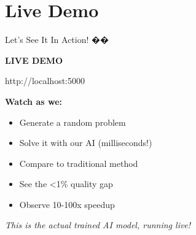 \documentclass[aspectratio=169]{beamer}
\begin{document}

\section{Live Demo}

\begin{frame}{Let's See It In Action! ��}
\begin{center}
\LARGE \textbf{LIVE DEMO}

\vspace{1cm}

\large \textcolor{aiblue}{http://localhost:5000}

\vspace{1cm}

\normalsize
\textbf{Watch as we:}
\begin{itemize}
    \item Generate a random problem
    \item Solve it with our AI (milliseconds!)
    \item Compare to traditional method
    \item See the <1\% quality gap
    \item Observe 10-100x speedup
\end{itemize}

\vspace{0.5cm}
\textit{This is the actual trained AI model, running live!}
\end{center}
\end{frame}
\end{document}
